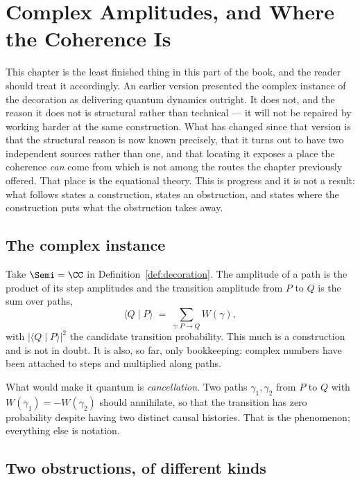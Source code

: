 \chapter{Complex Amplitudes, and Where the Coherence Is}
\label{sec:quantum}

\begin{remark}
\label{rmk:ch09status}
This chapter is the least finished thing in this part of the book, and the
reader should treat it accordingly.  An earlier version presented the
complex instance of the decoration as delivering quantum dynamics
outright.  It does not, and the reason it does not is structural rather
than technical --- it will not be repaired by working harder at the same
construction.  What has changed since that version is that the structural
reason is now known precisely, that it turns out to have two independent
sources rather than one, and that locating it exposes a place the
coherence \emph{can} come from which is not among the routes the chapter
previously offered.  That place is the equational theory.  This is
progress and it is not a result: what follows states a construction,
states an obstruction, and states where the construction puts what the
obstruction takes away.
\end{remark}

\section{The complex instance}

Take $\Semi = \CC$ in Definition~\ref{def:decoration}.  The amplitude of a
path is the product of its step amplitudes and the transition amplitude
from $P$ to $Q$ is the sum over paths,
\[
  \langle Q \mid P \rangle \;=\; \sum_{\gamma : P \to Q} W(\gamma),
\]
with $|\langle Q \mid P\rangle|^2$ the candidate transition probability.
This much is a construction and is not in doubt.  It is also, so far, only
bookkeeping: complex numbers have been attached to steps and multiplied
along paths.

What would make it quantum is \emph{cancellation}.  Two paths $\gamma_1,
\gamma_2$ from $P$ to $Q$ with $W(\gamma_1) = -W(\gamma_2)$ should
annihilate, so that the transition has zero probability despite having two
distinct causal histories.  That is the phenomenon; everything else is
notation.

\section{Two obstructions, of different kinds}
\label{sec:obstruction}

